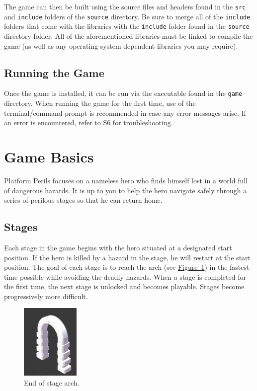 \documentclass[12pt, titlepage]{article}
\begin{document}
\noindent The game can then be built using the source files and headers found in the \texttt{src} and \texttt{include} folders of the \texttt{source} directory.  Be sure to merge all of the \texttt{include} folders that come with the libraries with the \texttt{include} folder found in the \texttt{source} directory folder.  All of the aforementioned libraries must be linked to compile the game (as well as any operating system dependent libraries you may require).

\subsection{Running the Game}
Once the game is installed, it can be run via the executable found in the \texttt{game} directory.  When running the game for the first time, use of the terminal/command prompt is recommended in case any error messages arise.  If an error is encountered, refer to S6 for troubleshooting.


\section{Game Basics}
\label{sec:basics}
Platform Perils focuses on a nameless hero who finds himself lost in a world full of dangerous hazards.  It is up to you to help the hero navigate safely through a series of perilous stages so that he can return home.


\subsection{Stages}
\noindent Each stage in the game begins with the hero situated at a designated start position.  If the hero is killed by a hazard in the stage, he will restart at the start position.  The goal of each stage is to reach the arch (see \hyperref[fig:arch]{Figure~\ref*{fig:arch}}) in the fastest time possible while avoiding the deadly hazards. When a stage is completed for the first time, the next stage is unlocked and becomes playable.  Stages become progressively more difficult.

\begin{figure}[H]
\begin{center}
\includegraphics[width=0.25\textwidth]{door}
\caption{End of stage arch.} \label{fig:arch}
\end{center}
\end{figure}
\end{document}
